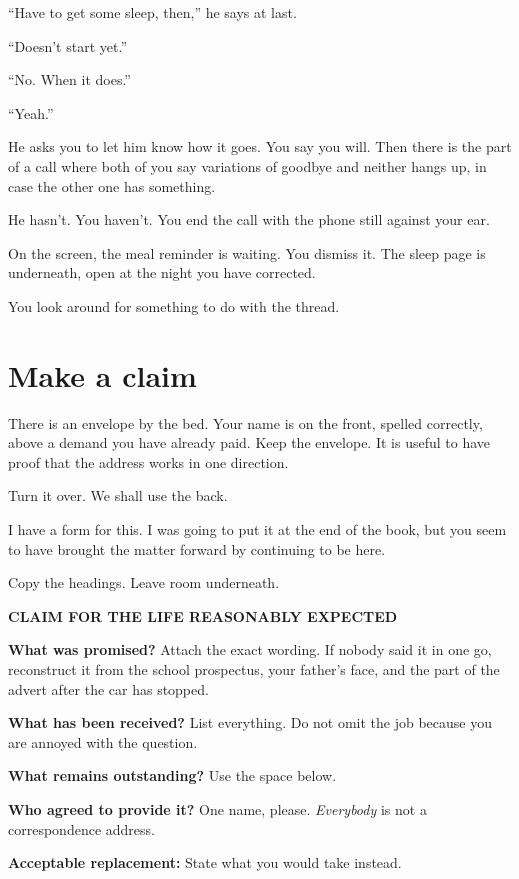 \documentclass[11pt,oneside]{book}
\begin{document}
``Have to get some sleep, then,'' he says at last.

``Doesn't start yet.''

``No. When it does.''

``Yeah.''

He asks you to let him know how it goes. You say you will. Then there is the part of a call where both of you say variations of goodbye and neither hangs up, in case the other one has something.

He hasn't. You haven't. You end the call with the phone still against your ear.

On the screen, the meal reminder is waiting. You dismiss it. The sleep page is underneath, open at the night you have corrected.

You look around for something to do with the thread.

\section*{Make a claim}

There is an envelope by the bed. Your name is on the front, spelled correctly, above a demand you have already paid. Keep the envelope. It is useful to have proof that the address works in one direction.

Turn it over. We shall use the back.

I have a form for this. I was going to put it at the end of the book, but you seem to have brought the matter forward by continuing to be here.

Copy the headings. Leave room underneath.

\textbf{CLAIM FOR THE LIFE REASONABLY EXPECTED}

\textbf{What was promised?} Attach the exact wording. If nobody said it in one go, reconstruct it from the school prospectus, your father's face, and the part of the advert after the car has stopped.

\textbf{What has been received?} List everything. Do not omit the job because you are annoyed with the question.

\textbf{What remains outstanding?} Use the space below.

\textbf{Who agreed to provide it?} One name, please. \emph{Everybody} is not a correspondence address.

\textbf{Acceptable replacement:} State what you would take instead.
\end{document}
